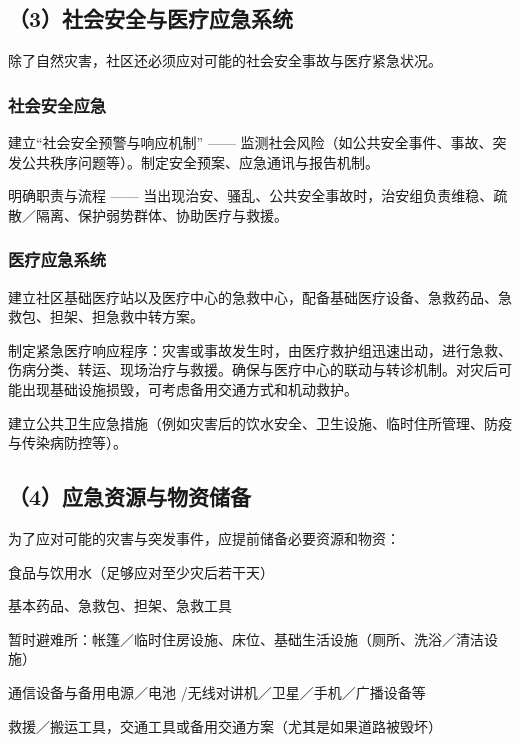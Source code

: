 \subsection{（3）社会安全与医疗应急系统}\label{ux793eux4f1aux5b89ux5168ux4e0eux533bux7597ux5e94ux6025ux7cfbux7edf}

除了自然灾害，社区还必须应对可能的社会安全事故与医疗紧急状况。

\subsubsection{社会安全应急}\label{ux793eux4f1aux5b89ux5168ux5e94ux6025}

建立``社会安全预警与响应机制'' ------ 监测社会风险（如公共安全事件、事故、突发公共秩序问题等）。制定安全预案、应急通讯与报告机制。

明确职责与流程 ------ 当出现治安、骚乱、公共安全事故时，治安组负责维稳、疏散／隔离、保护弱势群体、协助医疗与救援。

\subsubsection{医疗应急系统}\label{ux533bux7597ux5e94ux6025ux7cfbux7edf}

建立社区基础医疗站以及医疗中心的急救中心，配备基础医疗设备、急救药品、急救包、担架、担急救中转方案。

制定紧急医疗响应程序：灾害或事故发生时，由医疗救护组迅速出动，进行急救、伤病分类、转运、现场治疗与救援。确保与医疗中心的联动与转诊机制。对灾后可能出现基础设施损毁，可考虑备用交通方式和机动救护。

建立公共卫生应急措施（例如灾害后的饮水安全、卫生设施、临时住所管理、防疫与传染病防控等）。

\subsection{（4）应急资源与物资储备}\label{ux5e94ux6025ux8d44ux6e90ux4e0eux7269ux8d44ux50a8ux5907}

为了应对可能的灾害与突发事件，应提前储备必要资源和物资：

食品与饮用水（足够应对至少灾后若干天）

基本药品、急救包、担架、急救工具

暂时避难所：帐篷／临时住房设施、床位、基础生活设施（厕所、洗浴／清洁设施）

通信设备与备用电源／电池 /无线对讲机／卫星／手机／广播设备等

救援／搬运工具，交通工具或备用交通方案（尤其是如果道路被毁坏）

